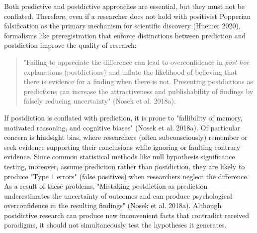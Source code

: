 \documentclass[article]{sa}
\begin{document}
Both predictive and postdictive approaches are essential, but they must
not be conflated. Therefore, even if a researcher does not hold with
positivist Popperian falsification as the primary mechanism for
scientific discovery (Huemer 2020), formalisms like preregistration that
enforce distinctions between prediction and postdiction improve the
quality of research:

\begin{quote}

"Failing to appreciate the difference can lead to overconfidence in
\emph{post hoc} explanations (postdictions) and inflate the likelihood
of believing that there is evidence for a finding when there is not.
Presenting postdictions as predictions can increase the attractiveness
and publishability of findings by falsely reducing uncertainty" (Nosek
et al. 2018a).

\end{quote}

If postdiction is conflated with prediction, it is prone to "fallibility
of memory, motivated reasoning, and cognitive biases" (Nosek et al.
2018a). Of particular concern is hindsight bias, where researchers
(often subconsciously) remember or seek evidence supporting their
conclusions while ignoring or faulting contrary evidence. Since common
statistical methods like null hypothesis significance testing, moreover,
assume prediction rather than postdiction, they are likely to produce
"Type 1 errors" (false positives) when researchers neglect the
difference. As a result of these problems, "Mistaking postdiction as
prediction underestimates the uncertainty of outcomes and can produce
psychological overconfidence in the resulting findings" (Nosek et al.
2018a). Although postdictive research can produce new inconvenient facts
that contradict received paradigms, it should not simultaneously test
the hypotheses it generates.
\end{document}
